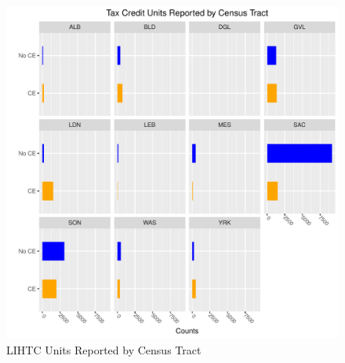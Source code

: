 \documentclass{article}\usepackage[]{graphicx}\usepackage[]{color}
\makeatletter
\def\maxwidth{ %
  \ifdim\Gin@nat@width>\linewidth
    \linewidth
  \else
    \Gin@nat@width
  \fi
}
\newenvironment{knitrout}{}{} %
\makeatother
\begin{document}
\begin{knitrout}
\color{fgcolor}\begin{figure}
\includegraphics[width=\maxwidth]{figure/MultiPlot_Tax_Units_Counts-1} \caption[LIHTC Units Reported by Census Tract]{LIHTC Units Reported by Census Tract}\label{fig:MultiPlot_Tax_Units_Counts}
\end{figure}


\end{knitrout}
\end{document}
